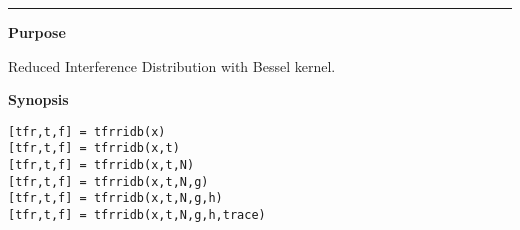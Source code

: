 

\hspace*{-1.6cm}{\Large \bf tfrridb}

\vspace*{-.4cm}
\hspace*{-1.6cm}\rule[0in]{16.5cm}{.02cm}
\vspace*{.2cm}

{\bf \large {}\selectfont Purpose}\\
\hspace*{1.5cm}
\begin{minipage}[t]{13.5cm}
Reduced Interference Distribution with Bessel kernel.
\end{minipage}
\vspace*{.5cm}

{\bf \large {}\selectfont Synopsis}\\
\hspace*{1.5cm}
\begin{minipage}[t]{13.5cm}
\begin{verbatim}
[tfr,t,f] = tfrridb(x)
[tfr,t,f] = tfrridb(x,t)
[tfr,t,f] = tfrridb(x,t,N)
[tfr,t,f] = tfrridb(x,t,N,g)
[tfr,t,f] = tfrridb(x,t,N,g,h)
[tfr,t,f] = tfrridb(x,t,N,g,h,trace)
\end{verbatim}
\end{minipage}
\vspace*{.5cm}

